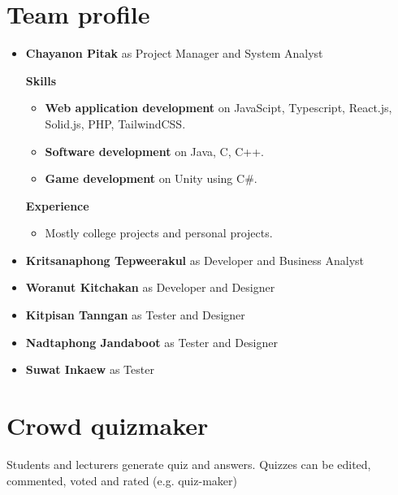 \documentclass[a4paper, 12pt]{report}
\begin{document}
    \section*{Team profile}
        \begin{itemize}
            \item \textbf{Chayanon Pitak} as Project Manager and System Analyst
            
                \textbf{Skills}
                \begin{itemize}
                    \item \textbf{Web application development} on JavaScipt, Typescript, React.js, Solid.js, PHP, TailwindCSS.
                    \item \textbf{Software development} on Java, C, C++.
                    \item \textbf{Game development} on Unity using C\#.
                \end{itemize}

                \textbf{Experience}
                \begin{itemize}
                    \item Mostly college projects and personal projects.
                \end{itemize}
            \item \textbf{Kritsanaphong Tepweerakul} as Developer and Business Analyst

            \item \textbf{Woranut Kitchakan} as Developer and Designer

            \item \textbf{Kitpisan Tanngan} as Tester and Designer

            \item \textbf{Nadtaphong Jandaboot} as Tester and Designer

            \item \textbf{Suwat Inkaew} as Tester

        \end{itemize}

    \pagebreak
    \section*{Crowd quizmaker}
    Students and lecturers generate quiz and answers. Quizzes can be edited, commented, voted and rated (e.g. quiz-maker)

\end{document}
